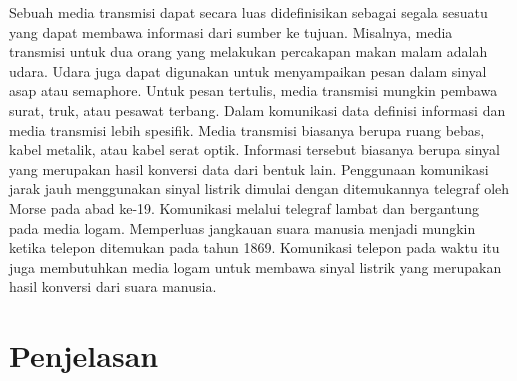 \documentclass[letterpaper]{article} %
\begin{document}
Sebuah media transmisi dapat secara luas didefinisikan sebagai segala sesuatu yang dapat membawa informasi dari sumber ke tujuan. Misalnya, media transmisi untuk dua orang yang melakukan percakapan makan malam adalah udara. Udara juga dapat digunakan untuk menyampaikan pesan dalam sinyal asap atau semaphore. Untuk pesan tertulis, media transmisi mungkin pembawa surat, truk, atau pesawat terbang. Dalam komunikasi data definisi informasi dan media transmisi lebih spesifik. Media transmisi biasanya berupa ruang bebas, kabel metalik, atau kabel serat optik. Informasi tersebut biasanya berupa sinyal yang merupakan hasil konversi data dari bentuk lain. Penggunaan komunikasi jarak jauh menggunakan sinyal listrik dimulai dengan ditemukannya telegraf oleh Morse pada abad ke-19. Komunikasi melalui telegraf lambat dan bergantung pada media logam. Memperluas jangkauan suara manusia menjadi mungkin ketika telepon ditemukan pada tahun 1869. Komunikasi telepon pada waktu itu juga membutuhkan media logam untuk membawa sinyal listrik yang merupakan hasil konversi dari suara manusia.

\section{Penjelasan}
\end{document}

